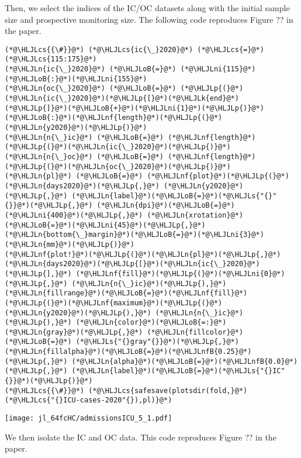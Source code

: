 \documentclass[12pt,a4paper]{article}
\newcommand{\HLJLk}[1]{\textcolor[RGB]{148,91,176}{\textbf{#1}}}
\newcommand{\HLJLn}[1]{#1}
\newcommand{\HLJLnf}[1]{\textcolor[RGB]{66,102,213}{#1}}
\newcommand{\HLJLs}[1]{\textcolor[RGB]{201,61,57}{#1}}
\newcommand{\HLJLnfB}[1]{\textcolor[RGB]{59,151,46}{#1}}
\newcommand{\HLJLni}[1]{\textcolor[RGB]{59,151,46}{#1}}
\newcommand{\HLJLoB}[1]{\textcolor[RGB]{102,102,102}{\textbf{#1}}}
\newcommand{\HLJLp}[1]{#1}
\newcommand{\HLJLcs}[1]{\textcolor[RGB]{153,153,119}{\textit{#1}}}
\begin{document}
Then, we select the indices of the IC/OC datasets along with the initial sample size and prospective monitoring size. The following code reproduces Figure ?? in the paper.


\begin{lstlisting}
(*@\HLJLcs{{\#}}@*) (*@\HLJLcs{ic{\_}2020}@*) (*@\HLJLcs{=}@*) (*@\HLJLcs{115:175}@*)
(*@\HLJLn{ic{\_}2020}@*) (*@\HLJLoB{=}@*) (*@\HLJLni{115}@*)(*@\HLJLoB{:}@*)(*@\HLJLni{155}@*)
(*@\HLJLn{oc{\_}2020}@*) (*@\HLJLoB{=}@*) (*@\HLJLp{(}@*)(*@\HLJLn{ic{\_}2020}@*)(*@\HLJLp{[}@*)(*@\HLJLk{end}@*)(*@\HLJLp{]}@*)(*@\HLJLoB{+}@*)(*@\HLJLni{1}@*)(*@\HLJLp{)}@*)(*@\HLJLoB{:}@*)(*@\HLJLnf{length}@*)(*@\HLJLp{(}@*)(*@\HLJLn{y2020}@*)(*@\HLJLp{)}@*)
(*@\HLJLn{n{\_}ic}@*) (*@\HLJLoB{=}@*) (*@\HLJLnf{length}@*)(*@\HLJLp{(}@*)(*@\HLJLn{ic{\_}2020}@*)(*@\HLJLp{)}@*)
(*@\HLJLn{n{\_}oc}@*) (*@\HLJLoB{=}@*) (*@\HLJLnf{length}@*)(*@\HLJLp{(}@*)(*@\HLJLn{oc{\_}2020}@*)(*@\HLJLp{)}@*)
(*@\HLJLn{pl}@*) (*@\HLJLoB{=}@*) (*@\HLJLnf{plot}@*)(*@\HLJLp{(}@*)(*@\HLJLn{days2020}@*)(*@\HLJLp{,}@*) (*@\HLJLn{y2020}@*)(*@\HLJLp{,}@*) (*@\HLJLn{label}@*)(*@\HLJLoB{=}@*)(*@\HLJLs{"{}"{}}@*)(*@\HLJLp{,}@*) (*@\HLJLn{dpi}@*)(*@\HLJLoB{=}@*)(*@\HLJLni{400}@*)(*@\HLJLp{,}@*) (*@\HLJLn{xrotation}@*)(*@\HLJLoB{=}@*)(*@\HLJLni{45}@*)(*@\HLJLp{,}@*) (*@\HLJLn{bottom{\_}margin}@*)(*@\HLJLoB{=}@*)(*@\HLJLni{3}@*)(*@\HLJLn{mm}@*)(*@\HLJLp{)}@*)
(*@\HLJLnf{plot!}@*)(*@\HLJLp{(}@*)(*@\HLJLn{pl}@*)(*@\HLJLp{,}@*) (*@\HLJLn{days2020}@*)(*@\HLJLp{[}@*)(*@\HLJLn{ic{\_}2020}@*)(*@\HLJLp{],}@*) (*@\HLJLnf{fill}@*)(*@\HLJLp{(}@*)(*@\HLJLni{0}@*)(*@\HLJLp{,}@*) (*@\HLJLn{n{\_}ic}@*)(*@\HLJLp{),}@*) (*@\HLJLn{fillrange}@*)(*@\HLJLoB{=}@*)(*@\HLJLnf{fill}@*)(*@\HLJLp{(}@*)(*@\HLJLnf{maximum}@*)(*@\HLJLp{(}@*)(*@\HLJLn{y2020}@*)(*@\HLJLp{),}@*) (*@\HLJLn{n{\_}ic}@*)(*@\HLJLp{),}@*) (*@\HLJLn{color}@*)(*@\HLJLoB{=:}@*)(*@\HLJLn{gray}@*)(*@\HLJLp{,}@*) (*@\HLJLn{fillcolor}@*) (*@\HLJLoB{=}@*) (*@\HLJLs{"{}gray"{}}@*)(*@\HLJLp{,}@*) (*@\HLJLn{fillalpha}@*)(*@\HLJLoB{=}@*)(*@\HLJLnfB{0.25}@*)(*@\HLJLp{,}@*) (*@\HLJLn{alpha}@*)(*@\HLJLoB{=}@*)(*@\HLJLnfB{0.0}@*)(*@\HLJLp{,}@*) (*@\HLJLn{label}@*)(*@\HLJLoB{=}@*)(*@\HLJLs{"{}IC"{}}@*)(*@\HLJLp{)}@*)
(*@\HLJLcs{{\#}}@*) (*@\HLJLcs{safesave(plotsdir(fold,}@*) (*@\HLJLcs{"{}ICU-cases-2020"{}),pl)}@*)
\end{lstlisting}

\texttt{[image: jl\_64fcHC/admissionsICU\_5\_1.pdf]}

We then isolate the IC and OC data. This code reproduces Figure ?? in the paper.
\end{document}

